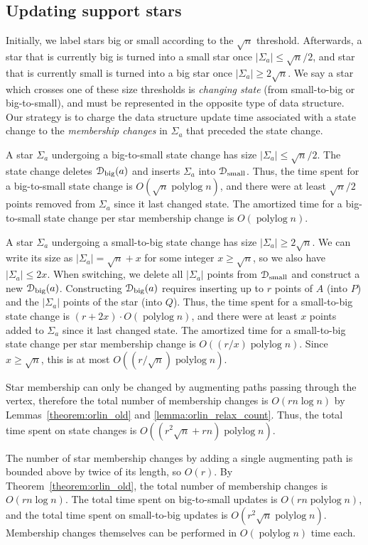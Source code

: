 \documentclass[a4paper,UKenglish]{socg-lipics-v2018}
\def\polylog{\mathop{\mathrm{polylog}}}
\def\abs#1{\mathopen| #1 \mathclose|}		%
\theoremstyle{plain}
\numberwithin{figure}{section}
\def\EMPH#1{\textcolor{BrickRed}{{\emph{#1}}}}
\begin{document}
\begin{toappendix}
\subsection{Updating support stars}
\label{SSA:update-support-star}

Initially, we label stars big or small according to the $\sqrt{n}$ threshold.
Afterwards, a star that is currently big is turned into a small star once
$\abs{\Sigma_a} \leq \sqrt{n}/2$, and star that is currently small is turned
into a big star once $\abs{\Sigma_a} \geq 2\sqrt{n}$.
We say a star which crosses one of these size thresholds is \EMPH{changing state}
(from small-to-big or big-to-small), and must be represented in the opposite
type of data structure.
Our strategy is to charge the data structure update time associated with a
state change to the \EMPH{membership changes} in $\Sigma_a$ that preceded the
state change.

A star $\Sigma_a$ undergoing a big-to-small state change has size
$\abs{\Sigma_a} \leq \sqrt{n}/2$.
The state change deletes $\EuScript{D}_\text{big}(a)$ and inserts $\Sigma_a$
into $\EuScript{D}_\text{small}$.
Thus, the time spent for a big-to-small state change is $O(\sqrt{n}\polylog n)$,
and there were at least $\sqrt{n}/2$ points removed from $\Sigma_a$ since it
last changed state.
The amortized time for a big-to-small state change per star membership change
is $O(\polylog n)$.

A star $\Sigma_a$ undergoing a small-to-big state change has size
$\abs{\Sigma_a} \geq 2\sqrt{n}$.
We can write its size as $\abs{\Sigma_a} = \sqrt{n} + x$ for some integer
$x \geq \sqrt{n}$, so we also have $\abs{\Sigma_a} \leq 2x$.
When switching, we delete all $\abs{\Sigma_a}$ points from
$\EuScript{D}_\text{small}$ and construct a new $\EuScript{D}_\text{big}(a)$.
Constructing $\EuScript{D}_\text{big}(a)$ requires inserting up to $r$ points
of $A$ (into $P$) and the $\abs{\Sigma_a}$ points of the star (into $Q$).
Thus, the time spent for a small-to-big state change is $(r + 2x) \cdot O(\polylog n)$,
and there were at least $x$ points added to $\Sigma_a$ since it last changed state.
The amortized time for a small-to-big state change per star membership change
is $O((r/x)\polylog n)$.
Since $x \geq \sqrt{n}$, this is at most $O((r/\sqrt{n})\polylog n)$.

Star membership can only be changed by augmenting paths passing through the
vertex, therefore the total number of membership changes is $O(rn\log n)$
by Lemmas~\ref{theorem:orlin_old} and \ref{lemma:orlin_relax_count}.
Thus, the total time spent on state changes is $O((r^2\sqrt{n} + rn)\polylog n)$.

\end{toappendix}
%
The number of star membership changes by adding a single augmenting path is
bounded above by twice of its length, so $O(r)$.
By Theorem~\ref{theorem:orlin_old}, the total number of membership changes is $O(rn\log n)$.
The total time spent on big-to-small updates is $O(rn\polylog n)$, and the
total time spent on small-to-big updates is $O(r^2\sqrt{n}\polylog n)$.
Membership changes themselves can be performed in $O(\polylog n)$ time each.
\end{document}
